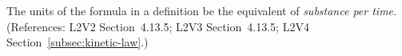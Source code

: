 The units of the  formula in a \KineticLaw definition  be
the equivalent of \emph{substance per time}.  (References: L2V2
Section~4.13.5; L2V3 Section~4.13.5; L2V4 Section~\ref{subsec:kinetic-law}.)
